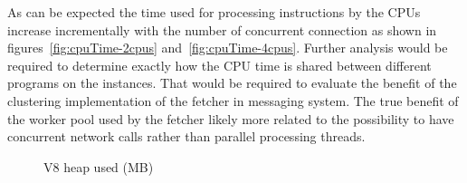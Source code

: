 \noindent
As can be expected the time used for processing instructions by the CPUs increase incrementally with the number of concurrent connection as shown in figures~\ref{fig:cpuTime-2cpus} and~\ref{fig:cpuTime-4cpus}. Further analysis would be required to determine exactly how the CPU time is shared between different programs on the instances. That would be required to evaluate the benefit of the clustering implementation of the fetcher in messaging system. The true benefit of the worker pool used by the fetcher likely more related to the possibility to have concurrent network calls rather than parallel processing threads.
\\
\begin{figure}[h!]
	\centering
	 \hfill
	\caption{V8 heap used (MB)}
\end{figure}

